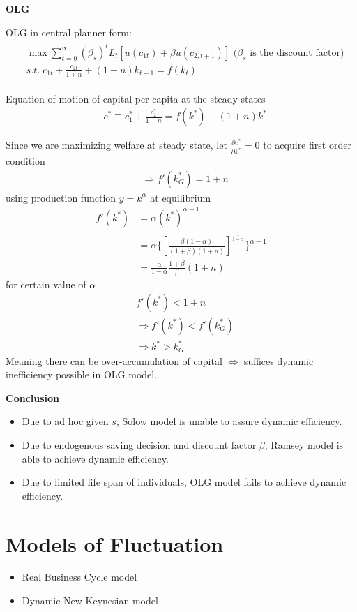 \documentclass{article}
\providecommand{\tightlist}{
  \setlength{\itemsep}{0pt}
  \setlength{\parskip}{0pt}}
\begin{document}
\textbf{OLG}

OLG in central planner form:
\begin{align}
\begin{split}
&\max \sum\limits_{t=0}^{\infty}(\beta_{s})^{t}L_{t}[u(c_{1t})+\beta u(c_{2,t+1})] \text{ ($\beta_s$ is the discount factor)}
\\&s.t. \; 
c_{1t}+\frac{c_{2t}}{1+n}+(1+n)k_{t+1}=f(k_{t})
\end{split}
\end{align}

Equation of motion of capital per capita at the steady states
\begin{align}
&c^{*}\equiv c_{1}^{*}+\frac{c_{2}^{*}}{1+n}=f(k^{*})-(1+n)k^{*}
\end{align}

Since we are maximizing welfare at steady state, let $\frac{\partial  c^{*}}{\partial  k^{*}}=0$ to acquire first order condition
\begin{align}
&\Rightarrow f'(k^{*}_{G})=1+n
\end{align}
using production function $y=k^\alpha$ at equilibrium
\begin{align}
f'(k^{*})&=\alpha (k^{*})^{\alpha-1}
\\&=\alpha\{[\frac{\beta(1-\alpha)}{(1+\beta)(1+n)}]^{\frac{1}{1-\alpha}}\}^{\alpha-1}
\\&=\frac{\alpha}{1-\alpha}\frac{1+\beta}{\beta}(1+n)
\end{align}
for certain value of $\alpha$
\begin{align}
&f'(k^{*})<1+n
\\&\Rightarrow f'(k^{*})<f'(k^{*}_{G})
\\& \Rightarrow k^{*}>k^{*}_{G}
\end{align}
Meaning there can be over-accumulation of capital $\iff$ suffices dynamic inefficiency possible in OLG model.

\textbf{Conclusion}
\begin{itemize}
\tightlist
  \item Due to ad hoc given $s$, Solow model is unable to assure dynamic efficiency.
  \item Due to endogenous saving decision and discount factor $\beta$, Ramsey model is able to achieve dynamic efficiency.
  \item Due to limited life span of individuals, OLG model fails to achieve dynamic efficiency.
\end{itemize}

\newpage
\part{Models of Fluctuation}
\begin{itemize}
\tightlist
  \item Real Business Cycle model
  \item Dynamic New Keynesian model
\end{itemize}
\end{document}
